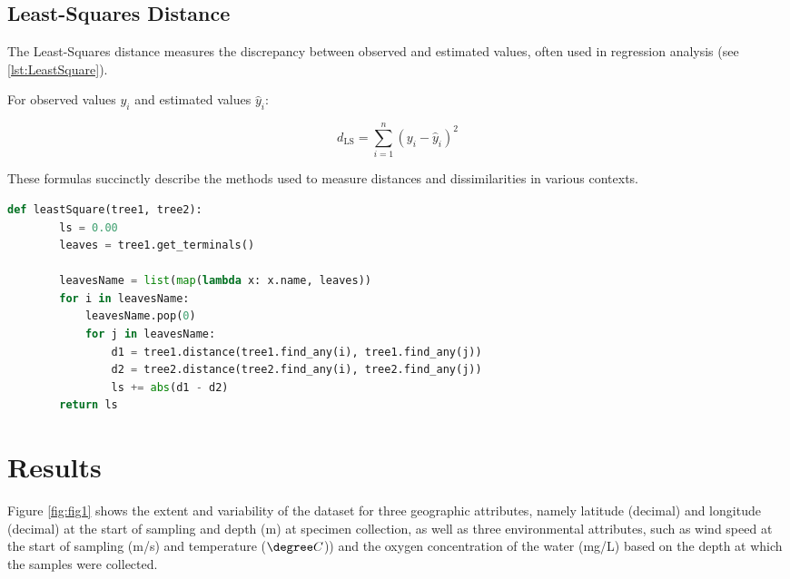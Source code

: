 \subsection{Least-Squares Distance}\label{LS}
The Least-Squares distance measures the discrepancy between observed and estimated values, often used in regression analysis (see \autoref{lst:LeastSquare}).

For observed values \( y_i \) and estimated values \( \hat{y}_i \):

\[ d_{\text{LS}} = \sum_{i=1}^{n} (y_i - \hat{y}_i)^2 \]

These formulas succinctly describe the methods used to measure distances and dissimilarities in various contexts.

\begin{lstlisting}[label=lst:LeastSquare,language=Python,caption=Python script for calculating the Least-Square distance using the ete3 package in aPhyloGeo package]
    def leastSquare(tree1, tree2):
        ls = 0.00
        leaves = tree1.get_terminals()

        leavesName = list(map(lambda x: x.name, leaves))
        for i in leavesName:
            leavesName.pop(0)
            for j in leavesName:
                d1 = tree1.distance(tree1.find_any(i), tree1.find_any(j))
                d2 = tree2.distance(tree2.find_any(i), tree2.find_any(j))
                ls += abs(d1 - d2)
        return ls
\end{lstlisting}

\section{Results}\label{results}

Figure \ref{fig:fig1} shows the extent and variability of the dataset for three geographic attributes, namely latitude (decimal) and longitude (decimal) at the start of sampling and depth (m) at specimen collection, as well as three environmental attributes, such as wind speed at the start of sampling (m/s) and temperature (\( \degree C \))) and the oxygen concentration of the water (mg/L) based on the depth at which the samples were collected.

